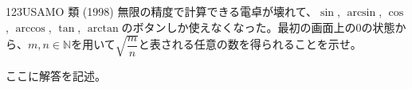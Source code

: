 \begin{thm}{123}{}{USAMO 類 (1998)}
 無限の精度で計算できる電卓が壊れて、$\sin$, $\arcsin$, $\cos$, $\arccos$, $\tan$, $\arctan$のボタンしか使えなくなった。最初の画面上の0の状態から、$m, n\in\mathbb{N}$を用いて$\sqrt{\dfrac{m}{n}}$と表される任意の数を得られることを示せ。
\end{thm}

ここに解答を記述。